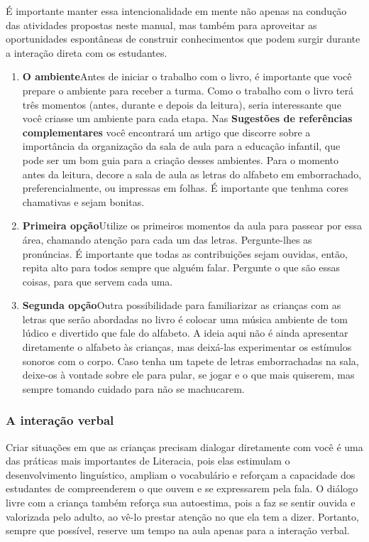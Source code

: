 \documentclass[11pt]{extarticle}
\begin{document}
É importante manter essa intencionalidade em mente não apenas na condução 
das atividades propostas neste manual, mas também para aproveitar as 
oportunidades espontâneas de construir conhecimentos que podem surgir durante 
a interação direta com os estudantes.

\begin{enumerate}
\item \textbf{O ambiente}\quad Antes de iniciar o trabalho com o livro, é importante que você 
prepare o ambiente para receber a turma. Como o trabalho com o livro terá 
três momentos (antes, durante e depois da leitura), seria interessante que você 
criasse um ambiente para cada etapa. Nas \textbf{Sugestões de referências complementares} 
você encontrará um artigo que discorre sobre a importância da organização da sala 
de aula para a educação infantil, que pode ser um bom guia para a criação desses 
ambientes. Para o momento antes da leitura, decore a sala de aula as letras
do alfabeto em emborrachado, preferencialmente, ou impressas em folhas.
É importante que tenhma cores chamativas e sejam bonitas. 


\item \textbf{Primeira opção}\quad Utilize os primeiros 
momentos da aula para passear por essa área, chamando atenção para cada um 
das letras. Pergunte-lhes as pronúncias. É importante que todas as contribuições sejam ouvidas, então,
repita alto para todos sempre que alguém falar. Pergunte o que são essas coisas, 
para que servem cada uma. 

\item \textbf{Segunda opção}\quad Outra possibilidade para familiarizar 
as crianças com as letras que serão abordadas no livro é colocar uma música ambiente
de tom lúdico e divertido que fale do alfabeto. A ideia aqui não
é ainda apresentar diretamente o alfabeto às crianças,
mas deixá-las experimentar os estímulos sonoros com o corpo. 
Caso tenha um tapete de letras emborrachadas na sala, deixe-os à vontade 
sobre ele para pular, se jogar e o que mais quiserem, mas sempre
tomando cuidado para não se machucarem.
\end{enumerate}


\subsubsection{A interação verbal} 
Criar situações em que as crianças precisam dialogar diretamente com 
você é uma das práticas mais importantes de Literacia, pois elas estimulam 
o desenvolvimento linguístico, ampliam o vocabulário e reforçam a 
capacidade dos estudantes de compreenderem o que ouvem e se expressarem 
pela fala. O diálogo livre com a criança também reforça sua autoestima, pois 
a faz se sentir ouvida e valorizada pelo adulto, ao vê-lo prestar atenção 
no que ela tem a dizer. Portanto, sempre que possível, reserve um tempo na 
aula apenas para a interação verbal. 
\end{document}
